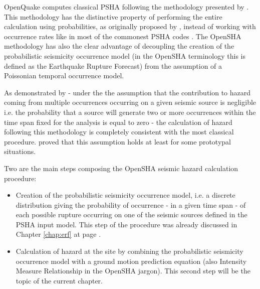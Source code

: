 OpenQuake computes classical PSHA 
\citep{cornell1968,mcguire2004} following the methodology presented by 
\citet{field2003}. This methodology has the distinctive property of performing
the entire calculation using probabilities, as originally proposed by 
\citet{chiang1984}, instead of working with occurrence rates like in most 
of the commonest PSHA codes \citep[see for instance][]{bender1987}. 
%
The OpenSHA methodology has also the clear advantage of decoupling the creation of the probabilistic seismicity occurrence model (in the OpenSHA terminology this is defined as the Earthquake Rupture Forecast) from the assumption of a Poissonian temporal occurrence model. 

As demonstrated by \citet{field2003} - under the the assumption that the contribution to hazard coming from multiple occurrences occurring on a given  seismic source is negligible i.e. the probability that a source will generate two or more occurrences within the time span fixed for the analysis is equal to zero - the calculation of hazard following this methodology is completely consistent with the most classical procedure.
% 
\citet{pagani2007} proved that this assumption holds at least for some prototypal situations.

Two are the main steps composing the OpenSHA seismic hazard calculation 
procedure:
%
\begin{itemize}
\item Creation of the probabilistic seismicity occurrence model, i.e. a discrete 
distribution giving the probability of occurrence - in a given time span - of each possible rupture occurring on one of the seismic sources defined in the PSHA input model. This step of the procedure was already discussed in 
Chapter \ref{chap:erf} at page \pageref{chap:erf}.
%
\item Calculation of hazard at the site by combining the probabilistic 
seismicity occurrence model with a ground motion prediction equation (also Intensity Measure Relationship in the OpenSHA jargon). This second step will be the topic of the current chapter.
\end{itemize}
%
